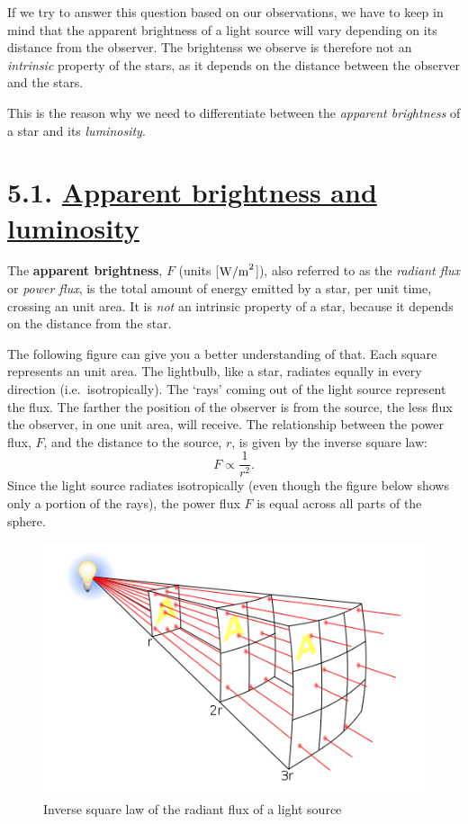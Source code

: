 \documentclass[
  letterpaper,
  DIV=11,
  numbers=noendperiod]{scrreprt}
\begin{document}
If we try to answer this question based on our observations, we have to
keep in mind that the apparent brightness of a light source will vary
depending on its distance from the observer. The brightenss we observe
is therefore not an \emph{intrinsic} property of the stars, as it
depends on the distance between the observer and the stars.

This is the reason why we need to differentiate between the
\emph{apparent brightness} of a star and its \emph{luminosity}.

\hypertarget{apparent-brightness-and-luminosity}{%
\section{\texorpdfstring{5.1. \protect\hyperlink{toc0_}{Apparent
brightness and
luminosity}}{5.1. Apparent brightness and luminosity}}\label{apparent-brightness-and-luminosity}}

The \textbf{apparent brightness}, \(F\) (units {[}\(\rm{W/m}^2\){]}),
also referred to as the \emph{radiant flux} or \emph{power flux}, is the
total amount of energy emitted by a star, per unit time, crossing an
unit area. It is \emph{not} an intrinsic property of a star, because it
depends on the distance from the star.

The following figure can give you a better understanding of that. Each
square represents an unit area. The lightbulb, like a star, radiates
equally in every direction (i.e.~isotropically). The `rays' coming out
of the light source represent the flux. The farther the position of the
observer is from the source, the less flux the observer, in one unit
area, will receive. The relationship between the power flux, \(F\), and
the distance to the source, \(r\), is given by the inverse square law:
\[F\propto \dfrac{1}{r^2}.\] Since the light source radiates
isotropically (even though the figure below shows only a portion of the
rays), the power flux \(F\) is equal across all parts of the sphere.

\begin{figure}

{\centering \includegraphics{img/inverse_square_law.png}

}

\caption{Inverse square law of the radiant flux of a light source}

\end{figure}
\end{document}
